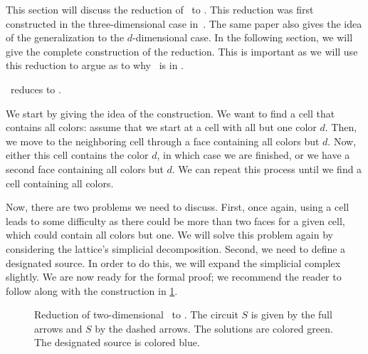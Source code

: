 This section will discuss the reduction of \Sperner\ to \EndOfLine. This reduction was first constructed in the three-dimensional case in~. The same paper also gives the idea of the generalization to the $d$-dimensional case. In the following section, we will give the complete construction of the reduction. This is important as we will use this reduction to argue as to why \Tarskistar\ is in \EOPL\@.

\begin{theorem}
	\Sperner\ reduces to \EndOfLine.
\end{theorem}

We start by giving the idea of the construction. We want to find a cell that contains all colors: assume that we start at a cell with all but one color $d$. Then, we move to the neighboring cell through a face containing all colors but $d$. Now, either this cell contains the color $d$, in which case we are finished, or we have a second face containing all colors but $d$. We can repeat this process until we find a cell containing all colors.


Now, there are two problems we need to discuss. First, once again, using a cell leads to some difficulty as there could be more than two faces for a given cell, which could contain all colors but one. We will solve this problem again by considering the lattice's simplicial decomposition. Second, we need to define a designated source. In order to do this, we will expand the simplicial complex slightly. We are now ready for the formal proof; we recommend the reader to follow along with the construction in \cref{fig:sperner_eol_reduction}.

\begin{figure}
	\centering
	\caption[Reduction of \Sperner\ to \EndOfLine]{Reduction of two-dimensional \Sperner\ to \EndOfLine. The circuit $S$ is given by the full arrows and $S$ by the dashed arrows. The solutions are colored green. The designated source is colored blue.}\label{fig:sperner_eol_reduction}
\end{figure}

